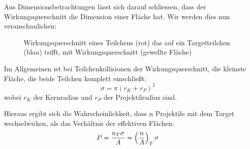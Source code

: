 \documentclass[Ex4_Zusammenfassung.tex]{subfiles}
\begin{document}
Aus Dimensionsbetrachtungen lässt sich darauf schliessen, dass der Wirkungsquerschnitt die Dimension einer Fläche hat. Wir werden dies nun veranschaulichen: 
\begin{figure}[h]
	\centering
	\caption{Wirkungsquerschnitt eines Teilchens (rot) das auf ein Targetteilchen (blau) trifft, mit Wirkungsquerschnitt (gewellte Fläche)}
\end{figure} \newline
Im Allgemeinen ist bei Teilchenkollisionen der Wirkungsquerschnitt, die kleinste Fläche, die beide Teilchen komplett einschließt: 
\begin{equation}
\sigma = \pi (r_{K} + r_{P})^2 
\end{equation}
wobei $ r_K $ der Kernradius und $ r_P $ der Projektilradius sind. 

Hieraus ergibt sich die Wahrscheinlichkeit, dass n Projektile mit dem Target wechselwirken, als das Verhältnis der effektiven Flächen:
\begin{equation}
	P = \frac{n_T \sigma}{A} = \left( \frac{n}{A} \right)_T \sigma
\end{equation}
\end{document}
